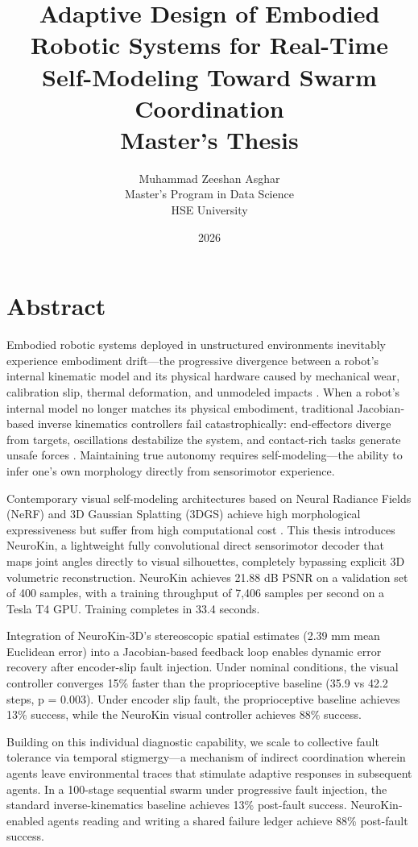\documentclass[12pt,a4paper,oneside]{report}
\title{
    \vspace{2cm}
    \textbf{\Large Adaptive Design of Embodied Robotic Systems for Real-Time Self-Modeling Toward Swarm Coordination} \\
    \vspace{1cm}
    \large Master's Thesis
}
\author{
    Muhammad Zeeshan Asghar \\
    Master's Program in Data Science \\
    HSE University
}
\date{\vspace{1cm} 2026}
\begin{document}
\maketitle
\clearpage

\chapter*{Abstract}

Embodied robotic systems deployed in unstructured environments inevitably experience embodiment drift---the progressive divergence between a robot's internal kinematic model and its physical hardware caused by mechanical wear, calibration slip, thermal deformation, and unmodeled impacts \cite{bongard2006resilient, cully2015robots}. When a robot's internal model no longer matches its physical embodiment, traditional Jacobian-based inverse kinematics controllers fail catastrophically: end-effectors diverge from targets, oscillations destabilize the system, and contact-rich tasks generate unsafe forces \cite{kwiatkowski2019task, chen2022full}. Maintaining true autonomy requires self-modeling---the ability to infer one's own morphology directly from sensorimotor experience.

Contemporary visual self-modeling architectures based on Neural Radiance Fields (NeRF) and 3D Gaussian Splatting (3DGS) achieve high morphological expressiveness but suffer from high computational cost \cite{hu2024teaching, hu2025learning}. This thesis introduces NeuroKin, a lightweight fully convolutional direct sensorimotor decoder that maps joint angles directly to visual silhouettes, completely bypassing explicit 3D volumetric reconstruction. NeuroKin achieves 21.88 dB PSNR on a validation set of 400 samples, with a training throughput of 7,406 samples per second on a Tesla T4 GPU. Training completes in 33.4 seconds.

Integration of NeuroKin-3D's stereoscopic spatial estimates (2.39 mm mean Euclidean error) into a Jacobian-based feedback loop enables dynamic error recovery after encoder-slip fault injection. Under nominal conditions, the visual controller converges 15\% faster than the proprioceptive baseline (35.9 vs 42.2 steps, p = 0.003). Under encoder slip fault, the proprioceptive baseline achieves 13\% success, while the NeuroKin visual controller achieves 88\% success.

Building on this individual diagnostic capability, we scale to collective fault tolerance via temporal stigmergy---a mechanism of indirect coordination wherein agents leave environmental traces that stimulate adaptive responses in subsequent agents. In a 100-stage sequential swarm under progressive fault injection, the standard inverse-kinematics baseline achieves 13\% post-fault success. NeuroKin-enabled agents reading and writing a shared failure ledger achieve 88\% post-fault success.
\end{document}
